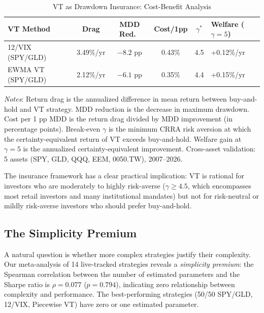 \documentclass[12pt,a4paper]{article}
\begin{document}
\begin{table}[H]
\centering
\small
\begin{threeparttable}
\caption{VT as Drawdown Insurance: Cost-Benefit Analysis}
\label{tab:insurance}
\begin{tabular}{@{}lccccl@{}}
\toprule
VT Method & Drag & MDD Red.\ & Cost/1pp & $\gamma^*$ & Welfare ($\gamma\!=\!5$) \\
\midrule
12/VIX (SPY/GLD) & 3.49\%/yr & $-8.2$ pp & 0.43\% & 4.5 & +0.12\%/yr \\
EWMA VT (SPY/GLD) & 2.12\%/yr & $-6.1$ pp & 0.35\% & 4.4 & +0.15\%/yr \\
\bottomrule
\end{tabular}
\begin{tablenotes}
\small
\item \textit{Notes}: Return drag is the annualized difference in mean return between buy-and-hold and VT strategy. MDD reduction is the decrease in maximum drawdown. Cost per 1 pp MDD is the return drag divided by MDD improvement (in percentage points). Break-even $\gamma$ is the minimum CRRA risk aversion at which the certainty-equivalent return of VT exceeds buy-and-hold. Welfare gain at $\gamma=5$ is the annualized certainty-equivalent improvement. Cross-asset validation: 5 assets (SPY, GLD, QQQ, EEM, 0050.TW), 2007--2026.
\end{tablenotes}
\end{threeparttable}
\end{table}

The insurance framework has a clear practical implication: VT is rational for investors who are moderately to highly risk-averse ($\gamma \geq 4.5$, which encompasses most retail investors and many institutional mandates) but not for risk-neutral or mildly risk-averse investors who should prefer buy-and-hold.

\subsection{The Simplicity Premium}

A natural question is whether more complex strategies justify their complexity. Our meta-analysis of 14 live-tracked strategies reveals a \emph{simplicity premium}: the Spearman correlation between the number of estimated parameters and the Sharpe ratio is $\rho = 0.077$ ($p = 0.794$), indicating zero relationship between complexity and performance. The best-performing strategies (50/50 SPY/GLD, 12/VIX, Piecewise VT) have zero or one estimated parameter.
\end{document}
